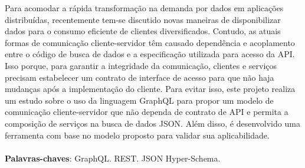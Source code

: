 \begin{resumo}
  Para acomodar a rápida transformação na demanda por dados em aplicações distribuídas, recentemente tem-se discutido novas maneiras de disponibilizar dados para o consumo eficiente de clientes diversificados. Contudo, as atuais formas de comunicação cliente-servidor têm causado dependência e acoplamento entre o código de busca de dados e a especificação utilizada para acesso da API. Isso porque, para garantir a integridade da comunicação, clientes e serviços precisam estabelecer um contrato de interface de acesso para que não haja mudanças após a implementação do cliente. Para evitar isso, este projeto realiza um estudo sobre o uso da linguagem GraphQL para propor um modelo de comunicação cliente-servidor que não dependa de contrato de API e permita a composição de serviços na busca de dados JSON. Além disso, é desenvolvido uma ferramenta com base no modelo proposto para validar sua aplicabilidade. \\ \\
  \textbf{Palavras-chaves}: GraphQL. REST. JSON Hyper-Schema.
\end{resumo}
